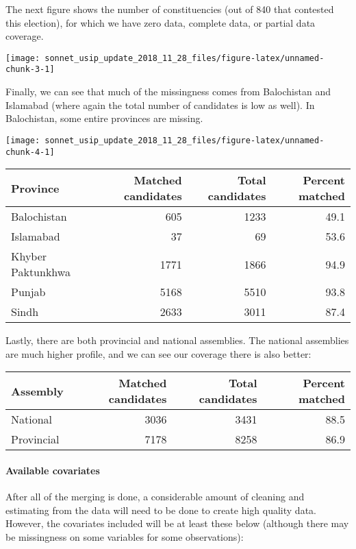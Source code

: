 \documentclass[]{article}
\let\oldparagraph\paragraph
\renewcommand{\paragraph}[1]{\oldparagraph{#1}\mbox{}}
\begin{document}
\newpage 

The next figure shows the number of constituencies (out of 840 that
contested this election), for which we have zero data, complete data, or
partial data coverage.

\begin{center}\texttt{[image: sonnet\_usip\_update\_2018\_11\_28\_files/figure-latex/unnamed-chunk-3-1]} \end{center}

Finally, we can see that much of the missingness comes from Balochistan
and Islamabad (where again the total number of candidates is low as
well). In Balochistan, some entire provinces are missing.

\begin{center}\texttt{[image: sonnet\_usip\_update\_2018\_11\_28\_files/figure-latex/unnamed-chunk-4-1]} \end{center}

\begin{longtable}[]{@{}lrrr@{}}
\toprule
Province & Matched candidates & Total candidates & Percent
matched\tabularnewline
\midrule
\endhead
Balochistan & 605 & 1233 & 49.1\tabularnewline
Islamabad & 37 & 69 & 53.6\tabularnewline
Khyber Paktunkhwa & 1771 & 1866 & 94.9\tabularnewline
Punjab & 5168 & 5510 & 93.8\tabularnewline
Sindh & 2633 & 3011 & 87.4\tabularnewline
\bottomrule
\end{longtable}

\newpage 

Lastly, there are both provincial and national assemblies. The national
assemblies are much higher profile, and we can see our coverage there is
also better:

\begin{longtable}[]{@{}lrrr@{}}
\toprule
Assembly & Matched candidates & Total candidates & Percent
matched\tabularnewline
\midrule
\endhead
National & 3036 & 3431 & 88.5\tabularnewline
Provincial & 7178 & 8258 & 86.9\tabularnewline
\bottomrule
\end{longtable}

\paragraph{Available covariates}\label{available-covariates}

After all of the merging is done, a considerable amount of cleaning and
estimating from the data will need to be done to create high quality
data. However, the covariates included will be at least these below
(although there may be missingness on some variables for some
observations):
\end{document}

